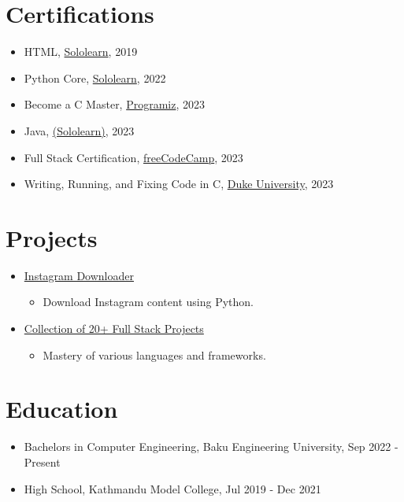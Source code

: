\documentclass[a4paper,10pt]{article}
\begin{document}
\begin{multicols}{2}
\section*{\textcolor{techblue}{Certifications}}
\begin{itemize}
    \item HTML, \href{https://www.sololearn.com/certificates/CT-FEALLKTT}{Sololearn}, 2019 
    \item Python Core, \href{https://www.sololearn.com/certificates/CT-QI3CPNPE}{Sololearn}, 2022 
    \item Become a C Master,  \href{https://programiz.pro/certificates/detail/021FB2F8FA21}{Programiz}, 2023
    \item Java, \href{https://www.sololearn.com/certificates/CT-VGCGTY4D}{(Sololearn)}, 2023 
    \item Full Stack Certification,  \href{https://www.freecodecamp.org/certification/prabesharyal/full-stack}{freeCodeCamp}, 2023
    \item Writing, Running, and Fixing Code in C, \href{https://coursera.org/share/ede0dc6f56168118d55d965a3d8f1f0e}{Duke University}, 2023 
\end{itemize}

\section*{\textcolor{techblue}{Projects}}
\begin{itemize}
    \item \href{https://github.com/prabesharyal/ig_dlp}{Instagram Downloader}
    \begin{itemize}
        \item Download Instagram content using Python.
    \end{itemize}
    \item \href{https://www.freecodecamp.org/prabesharyal}{Collection of 20+ Full Stack Projects }
    \begin{itemize}
        \item Mastery of various languages and frameworks.
    \end{itemize}
\end{itemize}

\section*{\textcolor{techblue}{Education}}
\begin{itemize}
    \item Bachelors in Computer Engineering, Baku Engineering University, Sep 2022 - Present
    \item High School, Kathmandu Model College, Jul 2019 - Dec 2021
\end{itemize}


\end{multicols}
\end{document}
